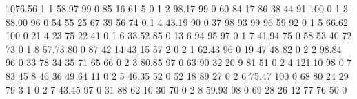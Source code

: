 \documentclass[paper=a4, fontsize=9pt]{scrartcl}
\begin{document}
\begin{multicols}{2}
{
\centering
\begin{code}
1076.56
1   1    58.97    99   0 85 16 61 5 0
1   2    98.17    99   0 60 84 17 86 38 44 91 100 0
1   3    88.00    96   0 54 55 25 67 39 56 74 0
1   4    43.19    90   0 37 98 93 99 96 59 92 0
1   5    66.62   100   0 21 4 23 75 22 41 0
1   6    33.52    85   0 13 6 94 95 97 0
1   7    41.94    75   0 58 53 40 72 73 0
1   8    57.73    80   0 87 42 14 43 15 57 2 0
2   1    62.43    96   0 19 47 48 82 0
2   2    98.84    96   0 33 78 34 35 71 65 66 0
2   3    80.85    97   0 63 90 32 20 9 81 51 0
2   4   121.10    98   0 7 83 45 8 46 36 49 64 11 0
2   5    46.35    52   0 52 18 89 27 0
2   6    75.47   100   0 68 80 24 29 79 3 1 0
2   7    43.45    97   0 31 88 62 10 30 70 0
2   8    59.93    98   0 69 28 26 12 77 76 50 0
\end{code}
\vspace*{-2mm}
\label{fig:code_delta_reinforcement}
}




\end{multicols}
\end{document}
